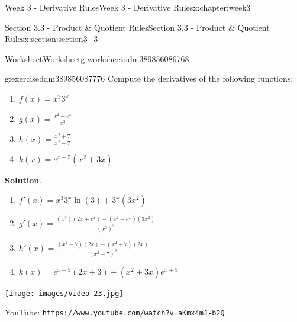 \documentclass[oneside,10pt,]{book}
\newcommand{\blocktitlefont}{\relax}
\newcommand{\mono}[1]{\texttt{#1}}
\numberwithin{equation}{section}
\newlength{\qrsize}
\newlength{\previewwidth}
\begin{document}
\begin{chapterptx}{Week 3 - Derivative Rules}{}{Week 3 - Derivative Rules}{}{}{x:chapter:week3}
\begin{sectionptx}{Section 3.3 - Product \& Quotient Rules}{}{Section 3.3 - Product \& Quotient Rules}{}{}{x:section:section3_3}
%
%
\typeout{************************************************}
\typeout{************************************************}
%
\begin{worksheet-subsection}{Worksheet}{}{Worksheet}{}{}{g:worksheet:idm389856086768}
\begin{divisionexercise}{1}{}{}{g:exercise:idm389856087776}%
Compute the derivatives of the following functions:%
%
\begin{enumerate}[label=(\alph*)]
\item{}\(\displaystyle f(x) = x^3 3^x\)%
\item{}\(\displaystyle g(x) = \frac{x^2 + e^x}{x^3}\)%
\item{}\(\displaystyle h(x) = \frac{x^2+7}{x^2-7}\)%
\item{}\(\displaystyle k(x) = e^{x+5}(x^2+3x)\)%
\end{enumerate}
\textbf{\blocktitlefont Solution}.\hypertarget{g:solution:idm389856108992}{}\quad{}%
\begin{enumerate}[label=(\alph*)]
\item{}\(\displaystyle f'(x) = x^3 3^x\ln(3)+3^x(3x^2)\)%
\item{}\(\displaystyle g'(x) = \frac{(x^3)(2x+e^x)-(x^2 + e^x)(3x^2)}{(x^3)^2}\)%
\item{}\(\displaystyle h'(x) = \frac{(x^2-7)(2x)-(x^2+7)(2x)}{(x^2-7)^2}\)%
\item{}\(\displaystyle k(x) = e^{x+5}(2x+3)+(x^2+3x)e^{x+5}\)%
\end{enumerate}
\end{divisionexercise}%
\end{worksheet-subsection}
\restoregeometry
\setlength{\qrsize}{9em}
\setlength{\previewwidth}{\linewidth}
\addtolength{\previewwidth}{-\qrsize}
\begin{tcbraster}[raster columns=2, raster column skip=1pt, raster halign=center, raster force size=false, raster left skip=0pt, raster right skip=0pt]%
\begin{tcolorbox}[previewstyle, width=\previewwidth]%
\texttt{[image: images/video-23.jpg]}%
\end{tcolorbox}%
\begin{tcolorbox}[qrstyle]%
{\hypersetup{urlcolor=black}}%
\end{tcolorbox}%
\begin{tcolorbox}[captionstyle]%
\small YouTube: \mono{https://www.youtube.com/watch?v=aKmx4mJ-b2Q}\end{tcolorbox}%

\end{tcbraster}
\end{sectionptx}
\end{chapterptx}
\end{document}
